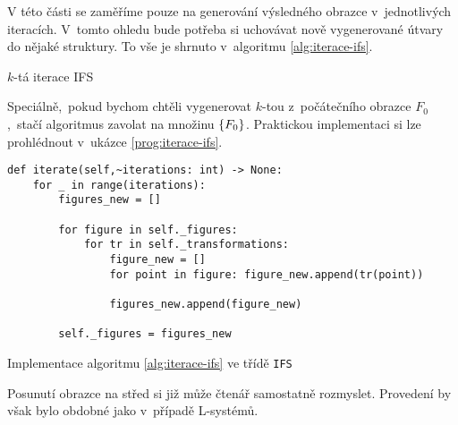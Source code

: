 V této části se zaměříme pouze na generování výsledného obrazce v~jednotlivých iteracích. V~tomto ohledu bude potřeba si uchovávat nově vygenerované útvary do nějaké struktury. To vše je shrnuto v~algoritmu \ref{alg:iterace-ifs}.
\begin{algorithm}[h]
    \;
    \caption{$k$-tá iterace IFS}
    \label{alg:iterace-ifs}
\end{algorithm}
Speciálně,~pokud bychom chtěli vygenerovat $k$-tou z~počátečního obrazce $F_0$,~stačí algoritmus zavolat na množinu $\left\{F_0\right\}$. Praktickou implementaci si lze prohlédnout v~ukázce \ref{prog:iterace-ifs}.
\begin{program}[h]
\begin{lstlisting}[style=python]
def iterate(self,~iterations: int) -> None:
    for _ in range(iterations):
        figures_new = []
        
        for figure in self._figures:
            for tr in self._transformations:
                figure_new = []
                for point in figure: figure_new.append(tr(point))

                figures_new.append(figure_new)
    
        self._figures = figures_new
\end{lstlisting}
    \caption{Implementace algoritmu \ref{alg:iterace-ifs} ve třídě \texttt{IFS}}
    \label{prog:iterace-ifs}
\end{program}
Posunutí obrazce na střed si již může čtenář samostatně rozmyslet. Provedení by však bylo obdobné jako v~případě L-systémů.